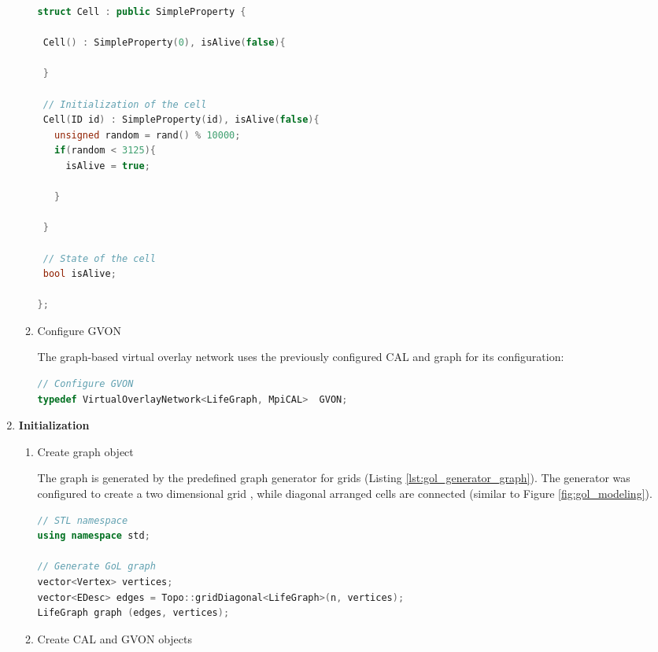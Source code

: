 \begin{enumerate}
\begin{enumerate}
\begin{lstlisting}[language=C++, label=lst:gol_cell, caption={\ }]
struct Cell : public SimpleProperty { 

 Cell() : SimpleProperty(0), isAlive(false){ 
          
 }
        
 // Initialization of the cell
 Cell(ID id) : SimpleProperty(id), isAlive(false){ 
   unsigned random = rand() % 10000;
   if(random < 3125){ 
     isAlive = true;
     
   }
   
 }

 // State of the cell
 bool isAlive;
 
};
\end{lstlisting}

\item Configure GVON

  The graph-based virtual overlay network uses the previously configured
  CAL and graph for its configuration:

  \begin{lstlisting}[language=C++, label=lst:conf_gvon, caption={\ }]
// Configure GVON
typedef VirtualOverlayNetwork<LifeGraph, MpiCAL>  GVON;
  \end{lstlisting}

\end{enumerate}

\item \textbf{Initialization}
  \begin{enumerate}
  
  \item Create graph object

    The graph is generated by the predefined graph generator for grids
    (Listing \ref{lst:gol_generator_graph}). The generator was
    configured to create a two dimensional grid , while diagonal
    arranged cells are connected (similar to Figure \ref{fig:gol_modeling}).

  \begin{lstlisting}[language=C++, label=lst:gol_generator_graph, caption={\ }]
// STL namespace
using namespace std;

// Generate GoL graph
vector<Vertex> vertices;
vector<EDesc> edges = Topo::gridDiagonal<LifeGraph>(n, vertices);
LifeGraph graph (edges, vertices); 
  \end{lstlisting}

\item Create CAL and GVON objects


\end{enumerate}
\end{enumerate}

